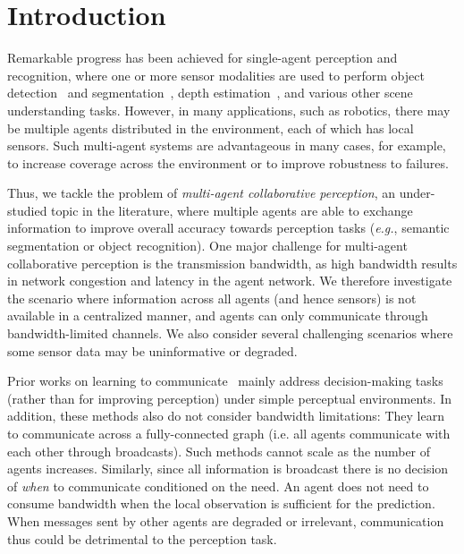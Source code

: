\section{Introduction}

Remarkable progress has been achieved for single-agent perception and recognition, where one or more sensor modalities are used to perform object detection~\cite{redmon2016you,Redmon_2017_CVPR,Lin_2017_ICCV} and segmentation~\cite{chen2018encoder,He_2017_ICCV,kirillov2019panoptic}, depth estimation~\cite{godard2017unsupervised,Zhou_2017_CVPR,godard2019digging}, and various other scene understanding tasks. 
However, in many applications, such as robotics, there may be multiple agents distributed in the environment, each of which has local sensors. 
Such multi-agent systems are advantageous in many cases, for example, to increase coverage across the environment or to improve robustness to failures. 


Thus, we tackle the problem of \textit{multi-agent collaborative perception}, an under-studied topic in the literature, where multiple agents are able to exchange information to improve overall accuracy towards perception tasks (\textit{e.g.}, semantic segmentation or object recognition).
One major challenge for multi-agent collaborative perception is the transmission bandwidth, as high bandwidth results in network congestion and latency in the agent network.
We therefore investigate the scenario where information across all agents (and hence sensors) is not available in a centralized manner, and agents can only communicate through bandwidth-limited channels. 
We also consider several challenging scenarios where some sensor data may be uninformative or degraded. 

Prior works on learning to communicate~\cite{sukhbaatar2016learning,foerster2016learning} mainly address decision-making tasks (rather than for improving perception) under simple perceptual environments. 
In addition, these methods also do not consider bandwidth limitations: They learn to communicate across a fully-connected graph (i.e. all agents communicate with each other through broadcasts).
Such methods cannot scale as the number of agents increases. 
Similarly, since all information is broadcast there is no decision of \textit{when} to communicate conditioned on the need. 
An agent does not need to consume bandwidth when the local observation is sufficient for the prediction. 
When messages sent by other agents are degraded or irrelevant, communication thus could be detrimental to the perception task.   

